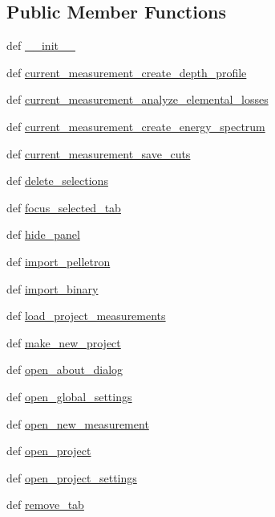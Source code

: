 \subsection*{Public Member Functions}
\begin{DoxyCompactItemize}
\item 
def \hyperlink{classpotku_1_1Potku_abacc6fcffce08f129e46912b46133980}{\-\_\-\-\_\-init\-\_\-\-\_\-}
\item 
def \hyperlink{classpotku_1_1Potku_ace8904ca1435e3ff39d022064d1b9e0e}{current\-\_\-measurement\-\_\-create\-\_\-depth\-\_\-profile}
\item 
def \hyperlink{classpotku_1_1Potku_a2e7801598b90f7fb0111765c7bc8d1da}{current\-\_\-measurement\-\_\-analyze\-\_\-elemental\-\_\-losses}
\item 
def \hyperlink{classpotku_1_1Potku_a11abb197b330cbc6d981536066b53cb9}{current\-\_\-measurement\-\_\-create\-\_\-energy\-\_\-spectrum}
\item 
def \hyperlink{classpotku_1_1Potku_a5b015e6566b0ec32ec03a519e498cbb3}{current\-\_\-measurement\-\_\-save\-\_\-cuts}
\item 
def \hyperlink{classpotku_1_1Potku_ae3ff955828ffc061f203028489060712}{delete\-\_\-selections}
\item 
def \hyperlink{classpotku_1_1Potku_a0b777a58cc571b39c9578574072c2ec8}{focus\-\_\-selected\-\_\-tab}
\item 
def \hyperlink{classpotku_1_1Potku_a7b6734d6454fe8f7e424a893f4adce6d}{hide\-\_\-panel}
\item 
def \hyperlink{classpotku_1_1Potku_a4bd36f54dc49a9da851a8fd04c3de6f5}{import\-\_\-pelletron}
\item 
def \hyperlink{classpotku_1_1Potku_a459c09c82e54c2fef28ca321ff1b0565}{import\-\_\-binary}
\item 
def \hyperlink{classpotku_1_1Potku_a6a563095f0717957f3009e228a55ddbe}{load\-\_\-project\-\_\-measurements}
\item 
def \hyperlink{classpotku_1_1Potku_a3c4fa17b8f0e571d2d5357ca7bc0ad67}{make\-\_\-new\-\_\-project}
\item 
def \hyperlink{classpotku_1_1Potku_ada5db2fbb788c3c13c997b6ea38b0048}{open\-\_\-about\-\_\-dialog}
\item 
def \hyperlink{classpotku_1_1Potku_a215b33676b4d5e5e561738b248002f88}{open\-\_\-global\-\_\-settings}
\item 
def \hyperlink{classpotku_1_1Potku_a27d976736e094d3921da22ffec8675d3}{open\-\_\-new\-\_\-measurement}
\item 
def \hyperlink{classpotku_1_1Potku_afe03b1f437b9085866226ee3a776be26}{open\-\_\-project}
\item 
def \hyperlink{classpotku_1_1Potku_ad3903c2c12be3d9f580f4113bdf7ff05}{open\-\_\-project\-\_\-settings}
\item 
def \hyperlink{classpotku_1_1Potku_a7156b065829863a689e6a11aafdd1d2f}{remove\-\_\-tab}
\end{DoxyCompactItemize}
